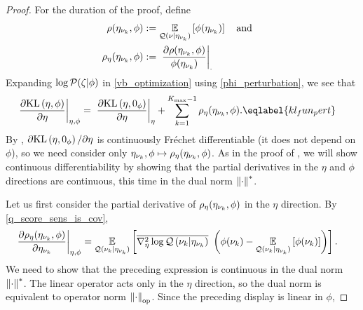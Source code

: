 \begin{thm}
\begin{proof}

For the duration of the proof, define
%
\begin{align*}
%
\rho(\etanuk, \phi) :={}&
    \expect{\q(\nu \vert \etanuk)}{\phi(\etanuk)}
\mathand\\
\rho_\eta(\etanuk, \phi) :={}&
    \fracat{\partial \rho(\etanuk, \phi)}{\phi(\etanuk)}.
%
\end{align*}
%
Expanding $\log \mathcal{P}(\zeta \vert \phi)$ in \eqref{vb_optimization} using
\eqref{phi_perturbation}, we see that
%
\begin{align}
\fracat{\partial \KL{\eta, \phi}}{\partial \eta}{\eta, \phi}
 ={}&
    \fracat{\partial \KL{\eta, \phiz}}{\partial \eta}{\eta} +
    \sumkm \rho_\eta(\etanuk, \phi). \eqlabel{kl_fun_pert}
%
\end{align}
%
By , $\partial \mathrm{KL}\left(\eta, 0_\phi\right) / \partial \eta$ is
continuously Fr{\'e}chet differentiable (it does not depend on $\phi$), so we
need consider only $\eta_{\nu_{k}}, \phi \mapsto \rho_\eta(\eta_{\nu_{k}}, \phi)$.  As
in the proof of , we will show continuous differentiability
by showing that the partial derivatives in the $\eta$ and $\phi$ directions
are continuous, this time in the dual norm $\left\Vert\cdot\right\Vert^*$.

Let us first consider the partial derivative of $\rho_\eta(\eta_{\nu_{k}}, \phi)$ in
the $\eta$ direction. By  \eqref{q_score_sens_is_cov},
%
\begin{align*}
%
\fracat{\partial \rho_\eta(\etanuk, \phi)}{\partial \etanuk}{\eta, \phi} ={}&
\expect{\q(\nuk \vert \etanuk)}{
   \lqhessbar{\nuk \vert \etanuk}
       \left(
        \phi(\nuk) - \expect{\q(\nuk \vert \etanuk)}{\phi(\nuk)}
       \right)
       }.
%
\end{align*}
%
We need to show that the preceding expression is continuous in the dual norm
$\left\Vert\cdot\right\Vert^*$.  The linear operator acts only in the $\eta$ direction, so
the dual norm is equivalent to operator norm $\left\Vert\cdot\right\Vert_{\mathrm{op}}$.  Since
the preceding display is linear in $\phi$,


\end{proof}
\end{thm}
